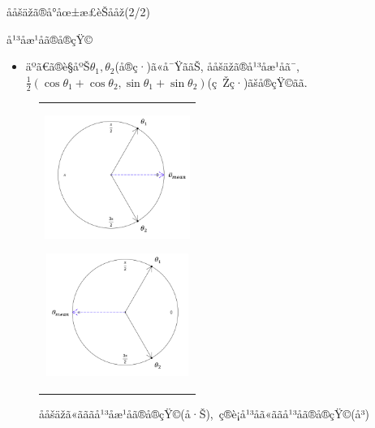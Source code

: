 \documentclass[dvipdfmx]{beamer} %
\begin{document}
\begin{frame}{ååšäžã®å°åœ±æ­£èŠååž(2/2)}

\begin{itembox}[l]{å¹³åæ¹åã®å®çŸ©}
\begin{itemize}

	\item 
	äºã€ã®è§åºŠ$\theta_1, \theta_2$(å®ç·)ã«å¯ŸããŠ, ååšäžã®å¹³åæ¹åã¯, $\frac{1}{2} (\cos \theta_1 + \cos \theta_2,\sin \theta_1 + \sin \theta_2)$(ç Žç·)ãšå®çŸ©ãã.
\end{itemize}
\end{itembox}

\vspace{-0.1cm}
\begin{figure}[H]
 \begin{tabular}{c}
 \begin{minipage}{0.5\hsize}
  \begin{center}
   \includegraphics[clip,height= 40mm]{data/sample_True_1.png}
\label{sample_mu1}
  \end{center}
 \end{minipage}
 \hspace{-0.8cm}
 \begin{minipage}{0.5\hsize}
  \begin{center}
 \includegraphics[clip,height= 40mm]{data/sample_False_1.png}
\label{sample_mu2}
  \end{center}
 \end{minipage}
\end{tabular}
\label{sample_mu}
\vspace{-0.1cm}
\caption{ååšäžã«ãããå¹³åæ¹åã®å®çŸ©(å·Š),\ ç®è¡å¹³åã«ããå¹³åã®å®çŸ©(å³)}
\end{figure}


\end{frame}
\end{document}
